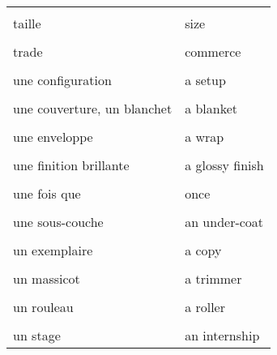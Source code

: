 \documentclass[
  10pt,
]{article}
\begin{document}
\begin{longtable}{ll}
\cellcolor{gray!6}{stokage} & \cellcolor{gray!6}{storage}\\

taille & size\\

\cellcolor{gray!6}{tomber, chuter} & \cellcolor{gray!6}{to fall (fell, fallen)}\\

trade & commerce\\

\cellcolor{gray!6}{une agence de communication} & \cellcolor{gray!6}{an ad(vertising) agency}\\

une configuration & a setup\\

\cellcolor{gray!6}{une couche} & \cellcolor{gray!6}{a layer}\\

une couverture, un blanchet & a blanket\\

\cellcolor{gray!6}{une encoche} & \cellcolor{gray!6}{a notch}\\

une enveloppe & a wrap\\

\cellcolor{gray!6}{une fente} & \cellcolor{gray!6}{a slit}\\

une finition brillante & a glossy finish\\

\cellcolor{gray!6}{une finition mate} & \cellcolor{gray!6}{a matte finish}\\

une fois que & once\\

\cellcolor{gray!6}{une plaque} & \cellcolor{gray!6}{a plate}\\

une sous-couche & an under-coat\\

\cellcolor{gray!6}{une surface, une tache} & \cellcolor{gray!6}{a spot}\\

un exemplaire & a copy\\

\cellcolor{gray!6}{un fichier numérique} & \cellcolor{gray!6}{a digital file}\\

un massicot & a trimmer\\

\cellcolor{gray!6}{un pli} & \cellcolor{gray!6}{a fold}\\

un rouleau & a roller\\

\cellcolor{gray!6}{un sondage} & \cellcolor{gray!6}{a poll}\\

un stage & an internship\\
\bottomrule
\end{longtable}
\end{document}
